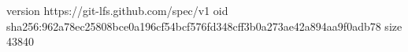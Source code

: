 version https://git-lfs.github.com/spec/v1
oid sha256:962a78ec25808bce0a196cf54bcf576fd348cff3b0a273ae42a894aa9f0adb78
size 43840

